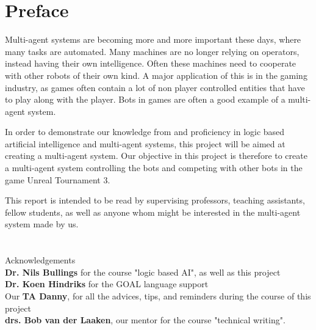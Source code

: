 \chapter*{Preface}
Multi-agent systems are becoming more and more important these days, where many tasks are automated. Many machines are no longer relying on operators, instead having their own intelligence. Often these machines need to cooperate with other robots of their own kind. A major application of this is in the gaming industry, as games often contain a lot of non player controlled entities that have to play along with the player. Bots in games are often a good example of a multi-agent system.

In order to demonstrate our knowledge from and proficiency in logic based artificial intelligence and multi-agent systems, this project will be aimed at creating a multi-agent system. Our objective in this project is therefore to create a multi-agent system controlling the bots and competing with other bots in the game Unreal Tournament 3. 
    
This report is intended to be read by supervising professors, teaching assistants, fellow students, as well as anyone whom might be interested in the multi-agent system made by us.
\\
\\
\\
Acknowledgements \\
    \textbf{Dr. Nils Bullings} for the course "logic based AI", as well as this project \\
    \textbf{Dr. Koen Hindriks} for the GOAL language support \\
    Our \textbf{TA Danny}, for all the advices, tips, and reminders during the course of this project \\
    \textbf{drs. Bob van der Laaken}, our mentor for the course "technical writing". \\